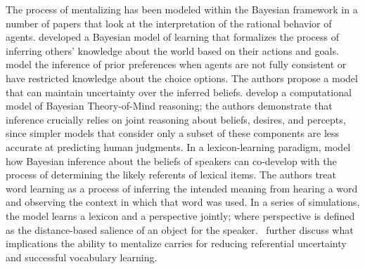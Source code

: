 \documentclass[11pt,a4paper]{article}
\begin{document}
The process of mentalizing has been modeled within the Bayesian framework in a number of papers that look at the interpretation of the rational behavior of agents.
 developed a Bayesian model of learning that formalizes the process of inferring others' knowledge about the world based on their actions and goals.
 model the inference of prior preferences when agents are not fully consistent or have restricted knowledge about the choice options.
The authors propose a model that can maintain uncertainty over the inferred beliefs. %
 develop a computational model of Bayesian Theory-of-Mind reasoning; %
the authors demonstrate that inference crucially relies on joint reasoning about beliefs, desires, and percepts, since simpler models that consider only a subset of these components are less accurate at predicting human judgments.
In a lexicon-learning paradigm,  model how Bayesian inference about the beliefs of speakers can co-develop with the process of determining the likely referents of lexical items.
The authors treat word learning as a process of inferring the intended meaning from hearing a word and observing the context in which that word was used.
In a series of simulations, the model learns a lexicon and a perspective jointly; where perspective is defined as the distance-based salience of an object for the speaker. %
\citeauthor{woensdregt2016modelling}~further discuss what implications the ability to mentalize carries for reducing referential uncertainty and successful vocabulary learning.


\end{document}
